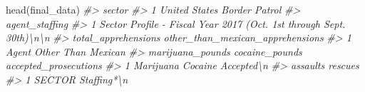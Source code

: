 \documentclass[
]{krantz}
\makeatletter
\newenvironment{Shaded}{\begin{snugshade}}{\end{snugshade}}
\newcommand{\CommentTok}[1]{\textcolor[rgb]{0.37,0.37,0.37}{\textit{#1}}}
\newcommand{\FunctionTok}[1]{\textcolor[rgb]{0,0,0}{#1}}
\newcommand{\NormalTok}[1]{#1}
\newenvironment{kframe}{%
\medskip{}
\setlength{\fboxsep}{.8em}
 \def\at@end@of@kframe{}%
 \ifinner\ifhmode%
  \def\at@end@of@kframe{\end{minipage}}%
  \begin{minipage}{\columnwidth}%
 \fi\fi%
 \def\FrameCommand##1{\hskip\@totalleftmargin \hskip-\fboxsep
 \colorbox{shadecolor}{##1}\hskip-\fboxsep
     \hskip-\linewidth \hskip-\@totalleftmargin \hskip\columnwidth}%
 \MakeFramed {\advance\hsize-\width
   \@totalleftmargin\z@ \linewidth\hsize
   \@setminipage}}%
 {\par\unskip\endMakeFramed%
 \at@end@of@kframe}
\renewenvironment{Shaded}{\begin{kframe}}{\end{kframe}}
\makeatother
\begin{document}
\begin{Shaded}
\begin{Highlighting}[]
\FunctionTok{head}\NormalTok{(final\_data)}
\CommentTok{\#\textgreater{}                        sector}
\CommentTok{\#\textgreater{} 1 United States Border Patrol}
\CommentTok{\#\textgreater{}                                                        agent\_staffing}
\CommentTok{\#\textgreater{} 1 Sector Profile {-} Fiscal Year 2017 (Oct. 1st through Sept. 30th)\textbackslash{}n\textbackslash{}n}
\CommentTok{\#\textgreater{}   total\_apprehensions other\_than\_mexican\_apprehensions}
\CommentTok{\#\textgreater{} 1               Agent               Other Than Mexican}
\CommentTok{\#\textgreater{}   marijuana\_pounds cocaine\_pounds accepted\_prosecutions}
\CommentTok{\#\textgreater{} 1        Marijuana        Cocaine            Accepted\textbackslash{}n}
\CommentTok{\#\textgreater{}   assaults     rescues}
\CommentTok{\#\textgreater{} 1   SECTOR Staffing*\textbackslash{}n}

\end{Highlighting}
\end{Shaded}
\end{document}
